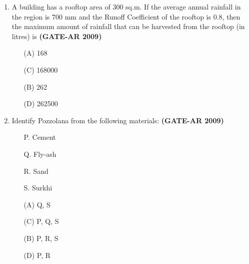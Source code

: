 \documentclass[a4paper,10pt]{article}
\begin{document}
\begin{enumerate}
    \item A building has a rooftop area of 300 sq.m. If the average annual rainfall in the region is 700 mm and the Runoff Coefficient of the rooftop is 0.8, then the maximum amount of rainfall that can be harvested from the rooftop (in litres) is \hfill \textbf{(GATE-AR 2009)}
    \begin{multicols}{2}
	\begin{itemize}
        \item[(A)] 168
        \item[(C)] 168000
        \item[(B)] 262
        \item[(D)] 262500
    \end{itemize}
	\end{multicols}

    \item Identify Pozzolana from the following materials: \hfill \textbf{(GATE-AR 2009)}
    \begin{itemize}
        \item[P.] Cement
        \item[Q.] Fly-ash
        \item[R.] Sand
        \item[S.] Surkhi
    \end{itemize}
    \begin{multicols}{2}
	\begin{itemize}
        \item[(A)] Q, S
        \item[(C)] P, Q, S
        \item[(B)] P, R, S
        \item[(D)] P, R
    \end{itemize}
	\end{multicols}


\end{enumerate}
\end{document}
